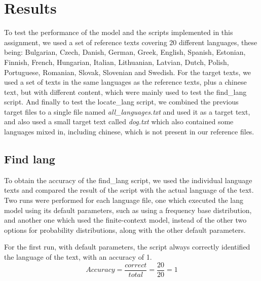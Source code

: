 \documentclass{article}
\begin{document}
\section{Results}
\label{sec:results}


To test the performance of the model and the scripts implemented in this assignment, we used a set of reference texts covering 20 different languages,
these being: Bulgarian, Czech, Danish, German, Greek, English, Spanish, Estonian, Finnish, French, Hungarian, Italian, Lithuanian, Latvian, Dutch, Polish, Portuguese, Romanian, Slovak, Slovenian and Swedish.
For the target texts, we used a set of texts in the same languages as the reference texts, plus a chinese text, but with different content, which were mainly used to test the find_lang script.
And finally to test the locate_lang script, we combined the previous target files to a single file named \textit{all_languages.txt} and used it as a target text, and also used a small target text called \textit{dog.txt}
which also contained some languages mixed in, including chinese, which is not present in our reference files.

\subsection{Find lang}
\label{subsec:results_find_lang}

To obtain the accuracy of the find_lang script, we used the individual language texts and compared the result of the script with the actual language of the text.
Two runs were performed for each language file, one which executed the lang model using its default parameters, such as using a frequency base distribution,
and another one which used the finite-context model, instead of the other two options for probability distributions, along with the other default parameters.

For the first run, with default parameters, the script always correctly identified the language of the text, with an accuracy of 1.
\begin{equation}
    \label{eq:find_lang_default_accuracy}
    Accuracy = \frac{correct}{total} = \frac{20}{20} = 1
\end{equation}
\end{document}
